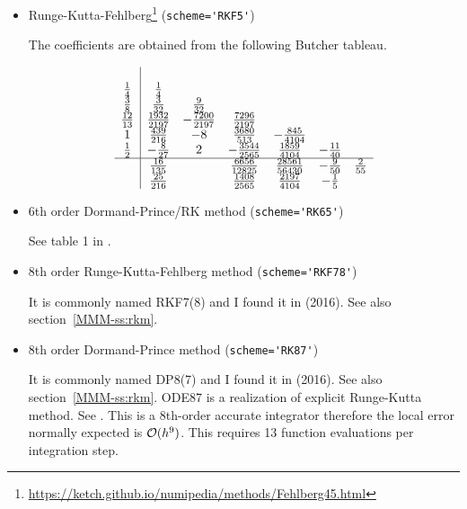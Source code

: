\begin{itemize}
\item Runge-Kutta-Fehlberg\footnote{\url{https://ketch.github.io/numipedia/methods/Fehlberg45.html}} 
(\lstinline{scheme='RKF5'})

The coefficients are obtained from the following Butcher tableau.

\begin{align} 
\begin{array}{c|cccccc} 
& & & & & & \\ 
\frac{1}{4} & \frac{1}{4} & & & & & \\ 
\frac{3}{8} & \frac{3}{32} & \frac{9}{32} & & & & \\ 
\frac{12}{13} & \frac{1932}{2197} & - \frac{7200}{2197} & \frac{7296}{2197} & & & \\ 
1 & \frac{439}{216} & -8 & \frac{3680}{513} & - \frac{845}{4104} & & \\ 
\frac{1}{2} & - \frac{8}{27} & 2 & - \frac{3544}{2565} & \frac{1859}{4104} & - \frac{11}{40} & \\ 
\hline & \frac{16}{135} & & \frac{6656}{12825} & \frac{28561}{56430} & - \frac{9}{50} & \frac{2}{55}\\ 
& \frac{25}{216} & & \frac{1408}{2565} & \frac{2197}{4104} & - \frac{1}{5} & 
\end{array}
\end{align}

\item 6th order Dormand-Prince/RK method (\lstinline{scheme='RK65'})

See table 1 in \textcite{prdo81}.

\item 8th order Runge-Kutta-Fehlberg method (\lstinline{scheme='RKF78'})

It is commonly named RKF7(8) and I found it in \textcite{bujk16} (2016).
See also section~\ref{MMM-ss:rkm}.

\item 8th order Dormand-Prince method (\lstinline{scheme='RK87'})

It is commonly named DP8(7) and I found it in \textcite{bujk16} (2016).
See also section~\ref{MMM-ss:rkm}.
ODE87  is a realization of explicit Runge-Kutta method. 
See .
This is a 8th-order accurate integrator therefore the local error normally
expected is ${\cal O}(h^9)$.  
This requires 13 function evaluations per integration step.

\end{itemize}


